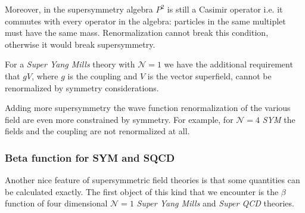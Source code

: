 Moreover, in the supersymmetry algebra $P^2$ is still a Casimir operator i.e. it commutes with every operator in the algebra: particles in the same multiplet must have the same mass.
Renormalization cannot break this condition, otherwise it would break supersymmetry.

For a \emph{Super Yang Mills} theory with $\mathcal{N} = 1$ we have the additional requirement that $g V$, where $g$ is the coupling and $V$ is the vector superfield, cannot be renormalized by symmetry considerations. 

Adding more supersymmetry the wave function renormalization of the various field are even more constrained by symmetry.
For example, for $\mathcal{N}=4$ \emph{SYM} the fields and the coupling are not renormalized at all.

















\subsubsection{Beta function for SYM and SQCD}
Another nice feature of supersymmetric field theories is that some quantities can be calculated exactly.
The first object of this kind that we encounter is the $\beta$ function of four dimensional $\mathcal{N} =  1 $ \emph{Super Yang Mills} and \emph{Super QCD} theories.

